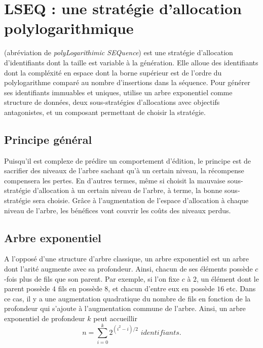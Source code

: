 
\section{LSEQ : une stratégie d'allocation polylogarithmique}

\LSEQ (abréviation de \emph{polyLogarithimic SEQuence}) est une stratégie
d'allocation d'identifiants dont la taille est variable à la génération. Elle
alloue des identifiants dont la compléxité en espace dont la borne supérieur est
de l'ordre du polylogarithme comparé au nombre d'insertions dans la séquence.
Pour générer ses identifiants immuables et uniques, \LSEQ utilise un arbre
exponentiel comme structure de données, deux sous-stratégies d'allocations avec
objectifs antagonistes, et un composant permettant de choisir la stratégie.

\subsection{Principe général}

Puisqu'il est complexe de prédire un comportement d'édition, le principe est de
sacrifier des niveaux de l'arbre sachant qu'à un certain niveau, la récompense
compensera les pertes. En d'autres termes, même si \LSEQ choisit la mauvaise
sous-stratégie d'allocation à un certain niveau de l'arbre, à terme, la bonne
sous-stratégie sera choisie. Grâce à l'augmentation de l'espace d'allocation à
chaque niveau de l'arbre, les bénéfices vont couvrir les coûts des niveaux
perdus.


\subsection{Arbre exponentiel}

A l'opposé d'une structure d'arbre classique, un arbre exponentiel est un arbre
dont l'arité augmente avec sa profondeur. Ainsi, chacun de ses éléments possède
$c$-fois plus de fils que son parent. Par exemple, si l'on fixe $c$ à $2$, un
élément dont le parent possède $4$ fils en possède $8$, et chacun d'entre eux en
possède $16$ etc. Dans ce cas, il y a une augmentation quadratique du nombre de
fils en fonction de la profondeur qui s'ajoute à l'augmentation commune de
l'arbre. Ainsi, un arbre exponentiel de profondeur $k$ peut accueillir 
\begin{equation}
  n = \sum\limits_{i=0}^{k} 2^{(i^2-i)/2}\,\, identifiants.
\end{equation}



